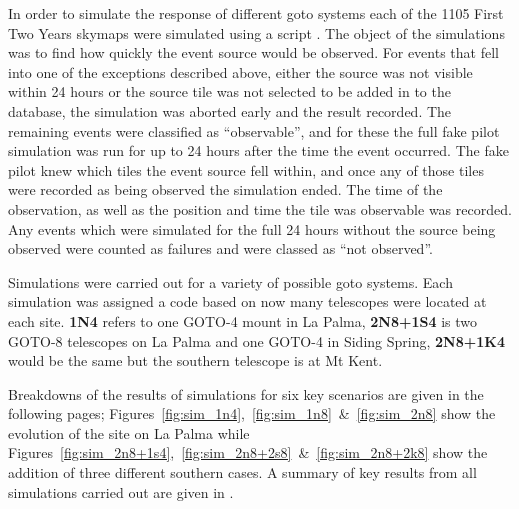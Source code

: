 \begin{colsection}
\begin{colsection}
In order to simulate the response of different \gls{goto} systems each of the 1105 First Two Years skymaps were simulated using a script . The object of the simulations was to find how quickly the event source would be observed. For events that fell into one of the exceptions described above, either the source was not visible within 24 hours or the source tile was not selected to be added in to the database, the simulation was aborted early and the result recorded. The remaining events were classified as ``observable'', and for these the full fake pilot simulation was run for up to 24 hours after the time the event occurred. The fake pilot knew which tiles the event source fell within, and once any of those tiles were recorded as being observed the simulation ended. The time of the observation, as well as the position and time the tile was observable was recorded. Any events which were simulated for the full 24 hours without the source being observed were counted as failures and were classed as ``not observed''.

Simulations were carried out for a variety of possible \gls{goto} systems. Each simulation was assigned a code based on now many telescopes were located at each site. \textbf{1N4} refers to one GOTO-4 mount in La Palma, \textbf{2N8+1S4} is two GOTO-8 telescopes on La Palma and one GOTO-4 in Siding Spring, \textbf{2N8+1K4} would be the same but the southern telescope is at Mt Kent.

Breakdowns of the results of simulations for six key scenarios are given in the following pages; Figures~\ref{fig:sim_1n4},~\ref{fig:sim_1n8}~\&~\ref{fig:sim_2n8} show the evolution of the site on La Palma while Figures~\ref{fig:sim_2n8+1s4},~\ref{fig:sim_2n8+2s8}~\&~\ref{fig:sim_2n8+2k8} show the addition of three different southern cases. A summary of key results from all simulations carried out are given in .

\newpage


\begin{figure}[p]
\begin{center}


\end{center}
\end{figure}
\end{colsection}
\end{colsection}
